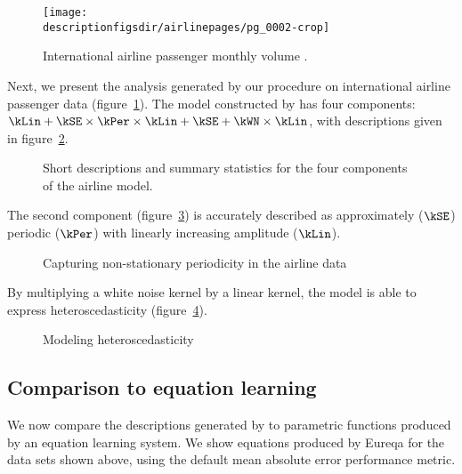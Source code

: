 \begin{figure}[h]
\centering
\texttt{[image: \\descriptionfigsdir/airlinepages/pg\_0002-crop]}
\caption{
International airline passenger monthly volume \citep[e.g.][]{box2013time}.}
\label{fig:airline}
\end{figure}

Next, we present the analysis generated by our procedure on international airline passenger data (figure~\ref{fig:airline}).
The model constructed by \procedurename{} has four components: $\kLin + \kSE \times \kPer \times \kLin + \kSE + \kWN \times \kLin$, with descriptions given in figure~\ref{fig:exec-airline}.

\begin{figure}[h]
\centering
{}
\caption{
Short descriptions and summary statistics for the four components of the airline model.}
\label{fig:exec-airline}
\end{figure}

The second component (figure~\ref{fig:lin_periodic}) is accurately described as approximately ($\kSE$) periodic ($\kPer$) with linearly increasing amplitude ($\kLin$).
%
\begin{figure}[h]
\centering
{}
\caption{Capturing non-stationary periodicity in the airline data}
\label{fig:lin_periodic}
\end{figure}
%
By multiplying a white noise kernel by a linear kernel, the model is able to express heteroscedasticity (figure~\ref{fig:heteroscedastic}).
%
\begin{figure}[h]
\centering
{}
\caption{Modeling heteroscedasticity}
\label{fig:heteroscedastic}
\end{figure}

\subsection{Comparison to equation learning}
\label{sec:eqn-learning-comp}

We now compare the descriptions generated by \procedurename{} to parametric functions produced by an equation learning system.
We show equations produced by Eureqa \citep{Eureqa} for the data sets shown above, using the default mean absolute error performance metric.

